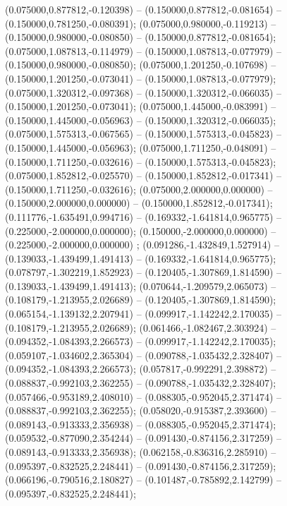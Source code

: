  (0.075000,0.877812,-0.120398) -- (0.150000,0.877812,-0.081654) -- (0.150000,0.781250,-0.080391);
 (0.075000,0.980000,-0.119213) -- (0.150000,0.980000,-0.080850) -- (0.150000,0.877812,-0.081654);
 (0.075000,1.087813,-0.114979) -- (0.150000,1.087813,-0.077979) -- (0.150000,0.980000,-0.080850);
 (0.075000,1.201250,-0.107698) -- (0.150000,1.201250,-0.073041) -- (0.150000,1.087813,-0.077979);
 (0.075000,1.320312,-0.097368) -- (0.150000,1.320312,-0.066035) -- (0.150000,1.201250,-0.073041);
 (0.075000,1.445000,-0.083991) -- (0.150000,1.445000,-0.056963) -- (0.150000,1.320312,-0.066035);
 (0.075000,1.575313,-0.067565) -- (0.150000,1.575313,-0.045823) -- (0.150000,1.445000,-0.056963);
 (0.075000,1.711250,-0.048091) -- (0.150000,1.711250,-0.032616) -- (0.150000,1.575313,-0.045823);
 (0.075000,1.852812,-0.025570) -- (0.150000,1.852812,-0.017341) -- (0.150000,1.711250,-0.032616);
 (0.075000,2.000000,0.000000) -- (0.150000,2.000000,0.000000) -- (0.150000,1.852812,-0.017341);
 (0.111776,-1.635491,0.994716) -- (0.169332,-1.641814,0.965775) -- (0.225000,-2.000000,0.000000);
 (0.150000,-2.000000,0.000000) -- (0.225000,-2.000000,0.000000) ;
 (0.091286,-1.432849,1.527914) -- (0.139033,-1.439499,1.491413) -- (0.169332,-1.641814,0.965775);
 (0.078797,-1.302219,1.852923) -- (0.120405,-1.307869,1.814590) -- (0.139033,-1.439499,1.491413);
 (0.070644,-1.209579,2.065073) -- (0.108179,-1.213955,2.026689) -- (0.120405,-1.307869,1.814590);
 (0.065154,-1.139132,2.207941) -- (0.099917,-1.142242,2.170035) -- (0.108179,-1.213955,2.026689);
 (0.061466,-1.082467,2.303924) -- (0.094352,-1.084393,2.266573) -- (0.099917,-1.142242,2.170035);
 (0.059107,-1.034602,2.365304) -- (0.090788,-1.035432,2.328407) -- (0.094352,-1.084393,2.266573);
 (0.057817,-0.992291,2.398872) -- (0.088837,-0.992103,2.362255) -- (0.090788,-1.035432,2.328407);
 (0.057466,-0.953189,2.408010) -- (0.088305,-0.952045,2.371474) -- (0.088837,-0.992103,2.362255);
 (0.058020,-0.915387,2.393600) -- (0.089143,-0.913333,2.356938) -- (0.088305,-0.952045,2.371474);
 (0.059532,-0.877090,2.354244) -- (0.091430,-0.874156,2.317259) -- (0.089143,-0.913333,2.356938);
 (0.062158,-0.836316,2.285910) -- (0.095397,-0.832525,2.248441) -- (0.091430,-0.874156,2.317259);
 (0.066196,-0.790516,2.180827) -- (0.101487,-0.785892,2.142799) -- (0.095397,-0.832525,2.248441);
